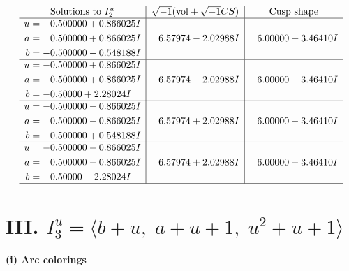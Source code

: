\documentclass[1p]{elsarticle_modified}
\theoremstyle{definition}
\newcommand{\I}{\sqrt{-1}}
\begin{document}
$$\begin{array}{c|c|c}  
\text{Solutions to }I^u_{2}& \I (\text{vol} + \sqrt{-1}CS) & \text{Cusp shape}\\
 \hline 
\begin{aligned}
u &= -0.500000 + 0.866025 I \\
a &= \phantom{-}0.500000 + 0.866025 I \\
b &= -0.500000 - 0.548188 I\end{aligned}
 & \phantom{-}6.57974 - 2.02988 I & \phantom{-}6.00000 + 3.46410 I \\ \hline\begin{aligned}
u &= -0.500000 + 0.866025 I \\
a &= \phantom{-}0.500000 + 0.866025 I \\
b &= -0.50000 + 2.28024 I\end{aligned}
 & \phantom{-}6.57974 - 2.02988 I & \phantom{-}6.00000 + 3.46410 I \\ \hline\begin{aligned}
u &= -0.500000 - 0.866025 I \\
a &= \phantom{-}0.500000 - 0.866025 I \\
b &= -0.500000 + 0.548188 I\end{aligned}
 & \phantom{-}6.57974 + 2.02988 I & \phantom{-}6.00000 - 3.46410 I \\ \hline\begin{aligned}
u &= -0.500000 - 0.866025 I \\
a &= \phantom{-}0.500000 - 0.866025 I \\
b &= -0.50000 - 2.28024 I\end{aligned}
 & \phantom{-}6.57974 + 2.02988 I & \phantom{-}6.00000 - 3.46410 I\\
 \hline 
 \end{array}$$\newpage\newpage\renewcommand{\arraystretch}{1}
\centering \section*{III. $I^u_{3}= \langle b+u,\;a+u+1,\;u^2+u+1 \rangle$}
\flushleft \textbf{(i) Arc colorings}\\
\end{document}
